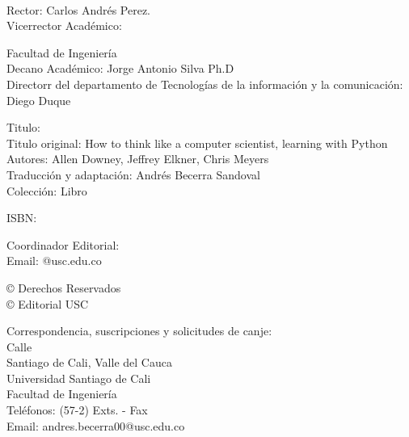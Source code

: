 \parindent0pt {\tiny{}\ }{\tiny \par}

{\scriptsize{}Rector: Carlos Andrés Perez.}\\
{\scriptsize{} Vicerrector Académico: }\\
{\scriptsize{} }{\scriptsize \par}

{\scriptsize{}Facultad de Ingeniería}\\
{\scriptsize{} Decano Académico: Jorge Antonio Silva Ph.D }\\
{\scriptsize{}Directorr del departamento de Tecnologías de la información
y la comunicación: Diego Duque}\\
{\scriptsize \par}

{\scriptsize{}Titulo: \introprog }\\
{\scriptsize{} Titulo original: How to think like a computer scientist,
learning with Python Autores: Allen Downey, Jeffrey Elkner, Chris
Meyers }\\
{\scriptsize{} Traducción y adaptación: Andrés Becerra Sandoval }\\
{\scriptsize{} Colección: Libro}\\
{\scriptsize \par}

{\scriptsize{}ISBN: }\\
{\scriptsize \par}

{\scriptsize{}Coordinador Editorial: }\\
{\scriptsize{} Email: @usc.edu.co}{\scriptsize \par}

{\scriptsize{}© Derechos Reservados}\\
{\scriptsize{} © Editorial USC}\\
{\scriptsize \par}

{\scriptsize{}Correspondencia, suscripciones y solicitudes de canje:}\\
{\scriptsize{} Calle }\\
{\scriptsize{} Santiago de Cali, Valle del Cauca}\\
{\scriptsize{} Universidad Santiago de Cali}\\
{\scriptsize{} Facultad de Ingeniería}\\
{\scriptsize{} Teléfonos: (57-2) Exts. - Fax }\\
{\scriptsize{} Email: andres.becerra00@usc.edu.co }\\
{\scriptsize \par}

